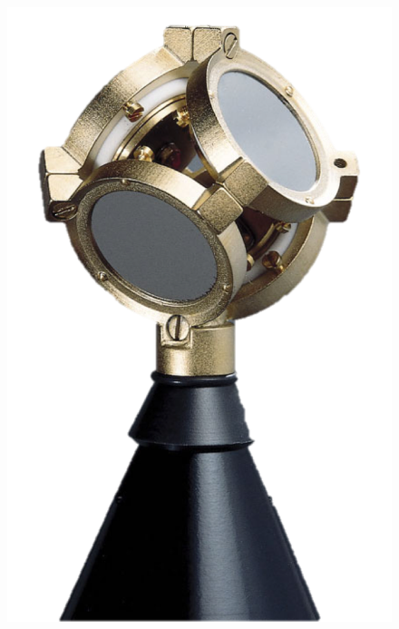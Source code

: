 \documentclass[../../main.tex]{subfiles}
\begin{document}
		\begin{figure}[ht]
			\begin{minipage}{0.5\textwidth}
				\center\includegraphics[scale = 0.3]{Sections/Background/images/soundFieldMic2.png}
			\end{minipage}
			\begin{minipage}{0.5\textwidth}

\end{minipage}
\end{figure}
\end{document}
